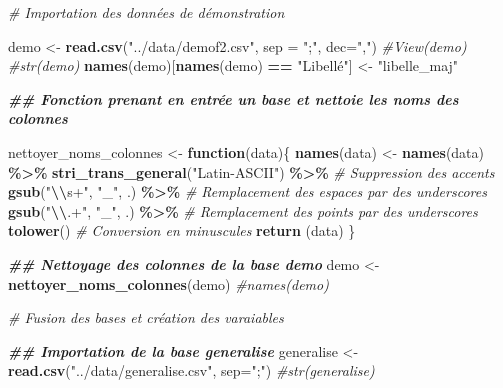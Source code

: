 \documentclass[
]{article}
\newenvironment{Shaded}{\begin{snugshade}}{\end{snugshade}}
\newcommand{\AttributeTok}[1]{\textcolor[rgb]{0.13,0.29,0.53}{#1}}
\newcommand{\CommentTok}[1]{\textcolor[rgb]{0.56,0.35,0.01}{\textit{#1}}}
\newcommand{\ControlFlowTok}[1]{\textcolor[rgb]{0.13,0.29,0.53}{\textbf{#1}}}
\newcommand{\DocumentationTok}[1]{\textcolor[rgb]{0.56,0.35,0.01}{\textbf{\textit{#1}}}}
\newcommand{\FunctionTok}[1]{\textcolor[rgb]{0.13,0.29,0.53}{\textbf{#1}}}
\newcommand{\NormalTok}[1]{#1}
\newcommand{\OtherTok}[1]{\textcolor[rgb]{0.56,0.35,0.01}{#1}}
\newcommand{\SpecialCharTok}[1]{\textcolor[rgb]{0.81,0.36,0.00}{\textbf{#1}}}
\newcommand{\StringTok}[1]{\textcolor[rgb]{0.31,0.60,0.02}{#1}}
\begin{document}
\begin{Shaded}
\begin{Highlighting}[]
\CommentTok{\# Importation des données de démonstration}

\NormalTok{demo }\OtherTok{\textless{}{-}} \FunctionTok{read.csv}\NormalTok{(}\StringTok{"../data/demof2.csv"}\NormalTok{, }\AttributeTok{sep =} \StringTok{";"}\NormalTok{, }\AttributeTok{dec=}\StringTok{","}\NormalTok{)}
\CommentTok{\#View(demo)}
\CommentTok{\#str(demo)}
\FunctionTok{names}\NormalTok{(demo)[}\FunctionTok{names}\NormalTok{(demo) }\SpecialCharTok{==} \StringTok{"Libellé"}\NormalTok{] }\OtherTok{\textless{}{-}} \StringTok{"libelle\_maj"}

\DocumentationTok{\#\# Fonction prenant en entrée un base et nettoie les noms des colonnes}

\NormalTok{nettoyer\_noms\_colonnes }\OtherTok{\textless{}{-}} \ControlFlowTok{function}\NormalTok{(data)\{}
  \FunctionTok{names}\NormalTok{(data) }\OtherTok{\textless{}{-}} \FunctionTok{names}\NormalTok{(data) }\SpecialCharTok{\%\textgreater{}\%}
    \FunctionTok{stri\_trans\_general}\NormalTok{(}\StringTok{"Latin{-}ASCII"}\NormalTok{) }\SpecialCharTok{\%\textgreater{}\%} \CommentTok{\# Suppression des accents}
    \FunctionTok{gsub}\NormalTok{(}\StringTok{"}\SpecialCharTok{\textbackslash{}\textbackslash{}}\StringTok{s+"}\NormalTok{, }\StringTok{"\_"}\NormalTok{, .) }\SpecialCharTok{\%\textgreater{}\%} \CommentTok{\# Remplacement des espaces par des underscores}
    \FunctionTok{gsub}\NormalTok{(}\StringTok{"}\SpecialCharTok{\textbackslash{}\textbackslash{}}\StringTok{.+"}\NormalTok{, }\StringTok{"\_"}\NormalTok{, .) }\SpecialCharTok{\%\textgreater{}\%} \CommentTok{\# Remplacement des points par des underscores}
    \FunctionTok{tolower}\NormalTok{() }\CommentTok{\# Conversion en minuscules}
  \FunctionTok{return}\NormalTok{ (data) }
\NormalTok{\}}

\DocumentationTok{\#\# Nettoyage des colonnes de la base demo}
\NormalTok{demo }\OtherTok{\textless{}{-}} \FunctionTok{nettoyer\_noms\_colonnes}\NormalTok{(demo)}
\CommentTok{\#names(demo)}


\CommentTok{\# Fusion des bases et création des varaiables}

\DocumentationTok{\#\# Importation de la base generalise}
\NormalTok{generalise }\OtherTok{\textless{}{-}} \FunctionTok{read.csv}\NormalTok{(}\StringTok{"../data/generalise.csv"}\NormalTok{, }\AttributeTok{sep=}\StringTok{";"}\NormalTok{)}
\CommentTok{\#str(generalise)}


\end{Highlighting}
\end{Shaded}
\end{document}
